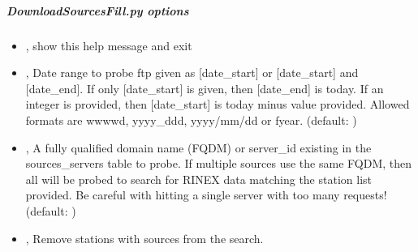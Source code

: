 \documentclass[letterpaper,10pt,english]{sphinxmanual}
\begin{document}
\subparagraph{DownloadSourcesFill.py options}
\label{\detokenize{pgamit.com:DownloadSourcesFill.py-options}}\begin{itemize}
\item {} 
\sphinxAtStartPar
{\hyperref[\detokenize{pgamit.com:DownloadSourcesFill.py--h}]{}}, {\hyperref[\detokenize{pgamit.com:DownloadSourcesFill.py---help}]{}} \sphinxhyphen{} show this help message and exit

\item {} 
\sphinxAtStartPar
{\hyperref[\detokenize{pgamit.com:DownloadSourcesFill.py--date}]{}} , {\hyperref[\detokenize{pgamit.com:DownloadSourcesFill.py---date_range}]{}}  \sphinxhyphen{} Date range to probe ftp given as {[}date\_start{]} or {[}date\_start{]} and {[}date\_end{]}. If only {[}date\_start{]} is given, then {[}date\_end{]} is today. If an integer is provided, then {[}date\_start{]} is today minus value provided. Allowed formats are wwww\sphinxhyphen{}d, yyyy\_ddd, yyyy/mm/dd or fyear. (default: )

\item {} 
\sphinxAtStartPar
{\hyperref[\detokenize{pgamit.com:DownloadSourcesFill.py--source}]{}} , {\hyperref[\detokenize{pgamit.com:DownloadSourcesFill.py---data_source}]{}}  \sphinxhyphen{} A fully qualified domain name (FQDM) or server\_id existing in the sources\_servers table to probe. If multiple sources use the same FQDM, then all will be probed to search for RINEX data matching the station list provided. Be careful with hitting a single server with too many requests! (default: )

\item {} 
\sphinxAtStartPar
{\hyperref[\detokenize{pgamit.com:DownloadSourcesFill.py--skip}]{}}, {\hyperref[\detokenize{pgamit.com:DownloadSourcesFill.py---skip_stations_with_source}]{}} \sphinxhyphen{} Remove stations with sources from the search.


\end{itemize}
\end{document}
